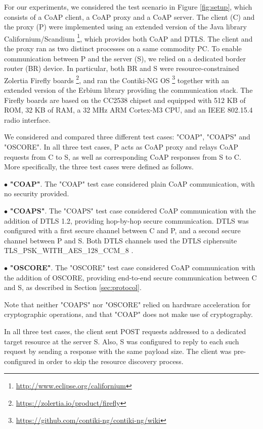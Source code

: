 {For our experiments, we considered the test scenario in Figure \ref{fig:setup}, which consists of a CoAP client, a CoAP proxy and a CoAP server. The client (C) and the proxy (P) were implemented using an extended version of the Java library Californium/Scandium \footnote{\url{http://www.eclipse.org/californium}}, which provides both CoAP and DTLS. The client and the proxy ran as two distinct processes on a same commodity PC. To enable communication between P and the server (S), we relied on a dedicated border router (BR) device. In particular, both BR and S were resource-constrained Zolertia Firefly boards \footnote{\url{https://zolertia.io/product/firefly}}, and ran the Contiki-NG OS \footnote{\url{https://github.com/contiki-ng/contiki-ng/wiki}} together with an extended version of the Erbium library providing the communication stack. The Firefly boards are based on the CC2538 chipset and equipped with 512 KB of ROM, 32 KB of RAM, a 32 MHz ARM Cortex-M3 CPU, and an IEEE 802.15.4 \cite{IEEEStd802.15.4} radio interface.

We considered and compared three different test cases: "COAP", "COAPS" and "OSCORE". In all three test cases, P acts as CoAP proxy and relays CoAP requests from C to S, as well as corresponding CoAP responses from S to C. More specifically, the three test cases were defined as follows.

\noindent
$\bullet$ \textbf{"COAP"}. The "COAP" test case considered plain CoAP communication, with no security provided.

\noindent
$\bullet$ \textbf{"COAPS"}. The "COAPS" test case considered CoAP communication with the addition of DTLS 1.2, providing hop-by-hop secure communication. DTLS was configured with a first secure channel between C and P, and a second secure channel between P and S. Both DTLS channels used the DTLS ciphersuite TLS\_PSK\_WITH\_AES\_128\_CCM\_8 \cite{rfc6655}.

\noindent
$\bullet$ \textbf{"OSCORE"}. The "OSCORE" test case considered CoAP communication with the addition of OSCORE, providing end-to-end secure communication between C and S, as described in Section \ref{sec:protocol}.

Note that neither "COAPS" nor "OSCORE" relied on hardware acceleration for cryptographic operations, and that "COAP" does not make use of cryptography.

In all three test cases, the client sent POST requests addressed to a dedicated target resource at the server S. Also, S was configured to reply to each such request by sending a response with the same payload size. The client was pre-configured in order to skip the resource discovery process.

}
